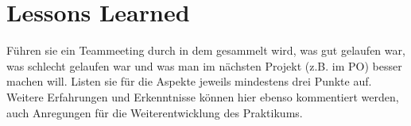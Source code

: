 \chapter{Lessons Learned}

Führen sie ein Teammeeting durch in dem gesammelt wird, was gut gelaufen
war, was schlecht gelaufen war und was man im nächsten Projekt (z.B. im
PO) besser machen will. Listen sie für die Aspekte jeweils mindestens
drei Punkte auf. Weitere Erfahrungen und Erkenntnisse können hier ebenso
kommentiert werden, auch Anregungen für die Weiterentwicklung des
Praktikums.
